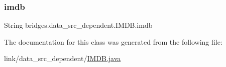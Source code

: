 \subsubsection{\texorpdfstring{imdb}{imdb}}
{\footnotesize\ttfamily String bridges.\+data\+\_\+src\+\_\+dependent.\+I\+M\+D\+B.\+imdb\hspace{0.3cm}{\ttfamily [protected]}}



The documentation for this class was generated from the following file\+:\begin{DoxyCompactItemize}
\item 
link/data\+\_\+src\+\_\+dependent/\hyperlink{_i_m_d_b_8java}{I\+M\+D\+B.\+java}\end{DoxyCompactItemize}
